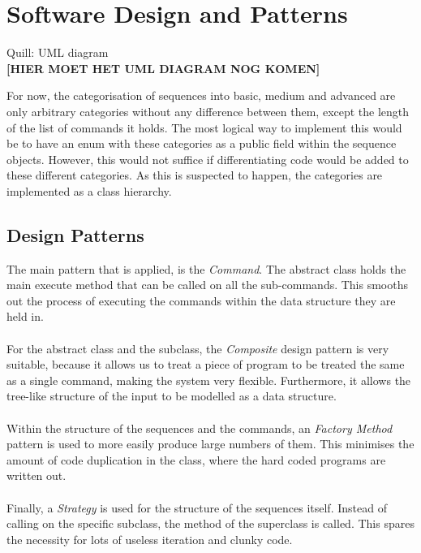 \chapter{Software Design and Patterns}
Quill: UML diagram\\

\textbf{[HIER MOET HET UML DIAGRAM NOG KOMEN]}

For now, the categorisation of sequences into basic, medium and advanced are only arbitrary categories without any difference between them, except the length of the list of commands it holds. The most logical way to implement this would be to have an enum with these categories as a public field within the sequence objects. However, this would not suffice if differentiating code would be added to these different categories. As this is suspected to happen, the categories are implemented as a class hierarchy. 

\section{Design Patterns}
The main pattern that is applied, is the \textit{Command}. The  abstract class holds the main execute method that can be called on all the sub-commands. This smooths out the process of executing the commands within the data structure they are held in. \\~\\

For the  abstract class and the  subclass, the \textit{Composite} design pattern is very suitable, because it allows us to treat a piece of program to be treated the same as a single command, making the system very flexible. Furthermore, it allows the tree-like structure of the input to be modelled as a data structure. \\~\\

Within the structure of the sequences and the commands, an \textit{Factory Method} pattern is used to more easily produce large numbers of them. This minimises the amount of code duplication in the  class, where the hard coded programs are written out.\\~\\

Finally, a \textit{Strategy} is used for the structure of the sequences itself. Instead of calling on the specific subclass, the  method of the superclass is called. This spares the necessity for lots of useless iteration and clunky code. \\~\\

